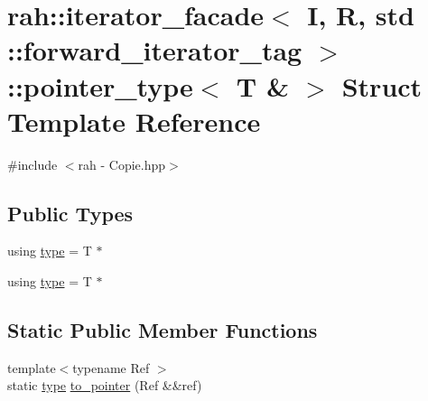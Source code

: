 \hypertarget{structrah_1_1iterator__facade_3_01_i_00_01_r_00_01std_01_1_1forward__iterator__tag_01_4_1_1pointer__type_3_01_t_01_6_01_4}{}\section{rah\+::iterator\+\_\+facade$<$ I, R, std \+::forward\+\_\+iterator\+\_\+tag $>$\+::pointer\+\_\+type$<$ T \& $>$ Struct Template Reference}
\label{structrah_1_1iterator__facade_3_01_i_00_01_r_00_01std_01_1_1forward__iterator__tag_01_4_1_1pointer__type_3_01_t_01_6_01_4}


{\ttfamily \#include $<$rah -\/ Copie.\+hpp$>$}

\subsection*{Public Types}
\begin{DoxyCompactItemize}
\item 
using \mbox{\hyperlink{structrah_1_1iterator__facade_3_01_i_00_01_r_00_01std_01_1_1forward__iterator__tag_01_4_1_1pointer__type_3_01_t_01_6_01_4_ab3c8d96b3dedfcf07cab8889136ca353}{type}} = T $\ast$
\item 
using \mbox{\hyperlink{structrah_1_1iterator__facade_3_01_i_00_01_r_00_01std_01_1_1forward__iterator__tag_01_4_1_1pointer__type_3_01_t_01_6_01_4_ab3c8d96b3dedfcf07cab8889136ca353}{type}} = T $\ast$
\end{DoxyCompactItemize}
\subsection*{Static Public Member Functions}
\begin{DoxyCompactItemize}
\item 
{\footnotesize template$<$typename Ref $>$ }\\static \mbox{\hyperlink{structrah_1_1iterator__facade_3_01_i_00_01_r_00_01std_01_1_1forward__iterator__tag_01_4_1_1pointer__type_3_01_t_01_6_01_4_ab3c8d96b3dedfcf07cab8889136ca353}{type}} \mbox{\hyperlink{structrah_1_1iterator__facade_3_01_i_00_01_r_00_01std_01_1_1forward__iterator__tag_01_4_1_1pointer__type_3_01_t_01_6_01_4_abc4075429345bf67b59bd1bd6477e4d8}{to\+\_\+pointer}} (Ref \&\&ref)
\end{DoxyCompactItemize}


